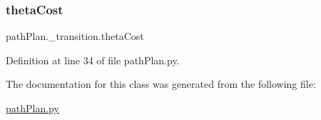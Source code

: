 \mbox{\label{classpath_plan_1_1__transition_a8ebd19a725cfc3f89d0ab7d98dc4b097}} 
\subsubsection{\texorpdfstring{theta\+Cost}{thetaCost}}
{\footnotesize\ttfamily path\+Plan.\+\_\+transition.\+theta\+Cost}



Definition at line 34 of file path\+Plan.\+py.



The documentation for this class was generated from the following file\+:\begin{DoxyCompactItemize}
\item 
\mbox{\hyperlink{path_plan_8py}{path\+Plan.\+py}}\end{DoxyCompactItemize}
